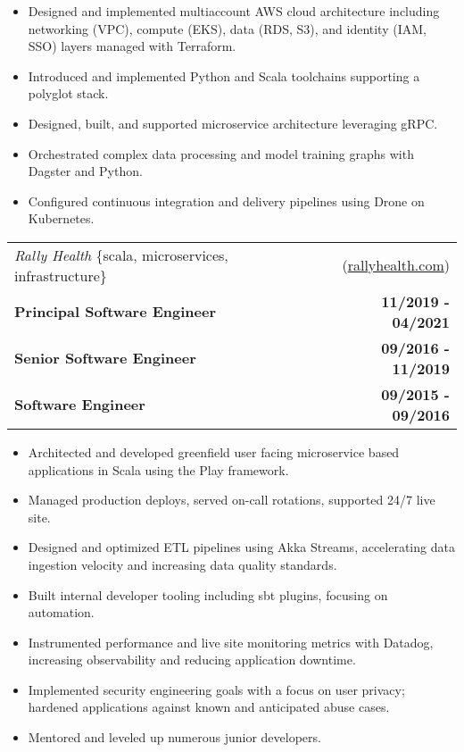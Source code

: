 \documentclass[10pt,letterpaper]{article}
\begin{document}
\begin{itemize}
  \item Designed and implemented multiaccount AWS cloud architecture including networking (VPC), \linebreak compute (EKS), data (RDS, S3), and identity (IAM, SSO) layers managed with Terraform.
\item Introduced and implemented Python and Scala toolchains supporting a polyglot stack.
\item Designed, built, and supported microservice architecture leveraging gRPC.
\item Orchestrated complex data processing and model training graphs with Dagster and Python.
\item Configured continuous integration and delivery pipelines using Drone on Kubernetes.
\end{itemize}

\vspace{0.25cm}


\noindent\begin{tabularx}{\textwidth}{@{} Xr @{}}
  \textit{Rally Health} \{scala, microservices, infrastructure\} & (\href{https://www.rallyhealth.com}{rallyhealth.com}) \\
  \textbf{Principal Software Engineer} & \textbf{11/2019 - 04/2021} \\
  \textbf{Senior Software Engineer} & \textbf{09/2016 - 11/2019} \\
  \textbf{Software Engineer} & \textbf{09/2015 - 09/2016} \\
\end{tabularx}

\begin{itemize}
\item Architected and developed greenfield user facing microservice based applications in \linebreak Scala using the Play framework.
\item Managed production deploys, served on-call rotations, supported 24/7 live site.
\item Designed and optimized ETL pipelines using Akka Streams, accelerating data ingestion \linebreak velocity and increasing data quality standards.
\item Built internal developer tooling including sbt plugins, focusing on automation.
\item Instrumented performance and live site monitoring metrics with Datadog, increasing \linebreak observability and reducing application downtime.
\item Implemented security engineering goals with a focus on user privacy; hardened \linebreak applications against known and anticipated abuse cases.
\item Mentored and leveled up numerous junior developers.
\end{itemize}
\end{document}
